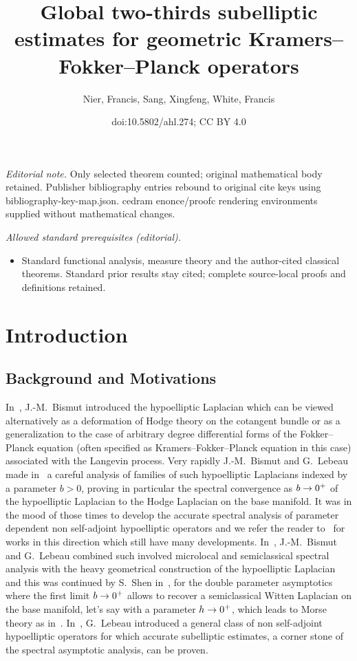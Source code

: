 \documentclass[10pt]{amsart}
\title{Global two-thirds subelliptic estimates for geometric Kramers--Fokker--Planck operators}
\author{Nier, Francis, Sang, Xingfeng, White, Francis}
\date{doi:10.5802/ahl.274; CC BY 4.0}
\theoremstyle{definition}\newtheorem{defi}[theo]{Definition}\newtheorem{rema}[theo]{Remark}\newtheorem{exam}[theo]{Example}\newtheorem{exem}[theo]{Example}\newtheorem{nota}[theo]{Notation}
\renewcommand*{\to}{\mathchoice{\longrightarrow}{\rightarrow}{\rightarrow}{\rightarrow}}
\begin{document}
\maketitle
\noindent\textit{Editorial note.} Only selected theorem counted; original mathematical body retained. Publisher bibliography entries rebound to original cite keys using bibliography-key-map.json. cedram enonce/proofc rendering environments supplied without mathematical changes.\par\medskip
\noindent\textit{Allowed standard prerequisites (editorial).}\begin{itemize}
\item Standard functional analysis, measure theory and the author-cited classical theorems. Standard prior results stay cited; complete source-local proofs and definitions retained.
\end{itemize}\medskip

\tableofcontents

\section{Introduction}

\subsection{Background and Motivations}

In~\cite{Bis042,Bis041,Bis05}, J.-M.~Bismut introduced the hypoelliptic Laplacian which can be viewed alternatively as a deformation of Hodge theory on the cotangent bundle or as a generalization to the case of arbitrary degree differential forms of the Fokker--Planck equation (often specified as Kramers--Fokker--Planck equation in this case) associated with the Langevin process. Very rapidly J.-M.~Bismut and G.~Lebeau made in~\cite{BiLe} a careful analysis of families of such hypoelliptic Laplacians indexed by a parameter $b>0$, proving in particular the spectral convergence as $b\to 0^{+}$ of the hypoelliptic Laplacian to the Hodge Laplacian on the base manifold. It was in the mood of those times to develop the accurate spectral analysis of parameter dependent non self-adjoint hypoelliptic operators and we refer the reader to~\cite{Dav,DSZ,HerNi,HHS} for works in this direction which still have many developments. In~\cite{BiLe}, J.-M.~Bismut and G.~Lebeau combined such involved microlocal and semiclassical spectral analysis with the heavy geometrical construction of the hypoelliptic Laplacian and this was continued by S.~Shen in~\cite{She}, for the double parameter asymptotics where the first limit $b\to 0^{+}$ allows to recover a semiclassical Witten Laplacian on the base manifold, let's say with a parameter $h\to 0^{+}$, which leads to Morse theory as in~\cite{HeSj4,Wit,Zha}. In~\cite{Leb1,Leb2}, G.~Lebeau introduced a general class of non self-adjoint hypoelliptic operators for which accurate subelliptic estimates, a corner stone of the spectral asymptotic analysis, can be proven.
\end{document}

